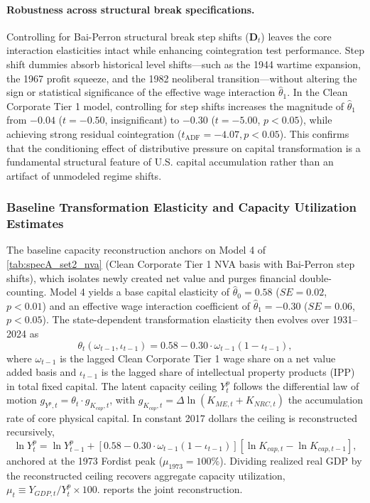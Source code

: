 \paragraph{Robustness across structural break specifications.}
Controlling for Bai-Perron structural break step shifts ($\mathbf{D}_t$) leaves the core interaction elasticities intact while enhancing cointegration test performance. Step shift dummies absorb historical level shifts---such as the 1944 wartime expansion, the 1967 profit squeeze, and the 1982 neoliberal transition---without altering the sign or statistical significance of the effective wage interaction $\hat{\theta}_1$. In the Clean Corporate Tier 1 model, controlling for step shifts increases the magnitude of $\hat{\theta}_1$ from $-0.04$ ($t = -0.50$, insignificant) to $-0.30$ ($t = -5.00$, $p < 0.05$), while achieving strong residual cointegration ($t_{\text{ADF}} = -4.07, p < 0.05$). This confirms that the conditioning effect of distributive pressure on capital transformation is a fundamental structural feature of U.S. capital accumulation rather than an artifact of unmodeled regime shifts.




\subsubsection{Baseline Transformation Elasticity and Capacity Utilization Estimates}
\label{sec:42:baseline_capacity}

The baseline capacity reconstruction anchors on Model 4 of
\cref{tab:specA_set2_nva} (Clean Corporate Tier 1 NVA basis with
Bai-Perron step shifts), which isolates newly created net value and
purges financial double-counting. Model 4 yields a base capital
elasticity of $\hat{\theta}_0 = 0.58$ ($SE = 0.02$, $p < 0.01$)
and an effective wage interaction coefficient of
$\hat{\theta}_1 = -0.30$ ($SE = 0.06$, $p < 0.05$). The
state-dependent transformation elasticity then evolves over
1931--2024 as
\begin{equation}
	\theta_t(\omega_{t-1}, \iota_{t-1})
	= 0.58 - 0.30 \cdot \omega_{t-1}(1 - \iota_{t-1}),
	\label{eq:42:theta_state}
\end{equation}
where $\omega_{t-1}$ is the lagged Clean Corporate Tier 1 wage
share on a net value added basis and $\iota_{t-1}$ is the lagged
share of intellectual property products (IPP) in total fixed
capital. The latent capacity ceiling $Y_t^p$ follows the
differential law of motion $g_{Y^p,t} = \theta_t \cdot
g_{K_{cap},t}$, with $g_{K_{cap},t} = \Delta \ln(K_{ME,t} +
K_{NRC,t})$ the accumulation rate of core physical capital. In
constant 2017 dollars the ceiling is reconstructed recursively,
\begin{equation}
	\ln Y_t^p = \ln Y_{t-1}^p
	+ \left[ 0.58 - 0.30 \cdot \omega_{t-1}(1 - \iota_{t-1}) \right]
	\left[ \ln K_{cap,t} - \ln K_{cap,t-1} \right],
	\label{eq:42:yp_recursion}
\end{equation}
anchored at the 1973 Fordist peak ($\mu_{1973} = 100\%$). Dividing
realized real GDP by the reconstructed ceiling recovers aggregate
capacity utilization, $\mu_t \equiv Y_{GDP,t}/Y_t^p \times 100$.
 reports the joint
reconstruction.

